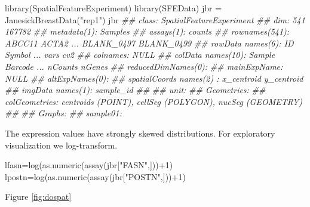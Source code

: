\documentclass[]{article}
\newcommand{\hlnum}[1]{\textcolor[rgb]{0.816,0.125,0.439}{#1}}%
\newcommand{\hlstr}[1]{\textcolor[rgb]{0.251,0.627,0.251}{#1}}%
\newcommand{\hlcom}[1]{\textcolor[rgb]{0.502,0.502,0.502}{\textit{#1}}}%
\newcommand{\hlopt}[1]{\textcolor[rgb]{0,0,0}{#1}}%
\newcommand{\hlstd}[1]{\textcolor[rgb]{0.251,0.251,0.251}{#1}}%
\newcommand{\hlkwd}[1]{\textcolor[rgb]{0.878,0.439,0.125}{#1}}%
\newenvironment{Shaded}{\begin{myshaded}}{\end{myshaded}}
\newcommand{\KeywordTok}[1]{\hlkwd{#1}}
\newcommand{\DecValTok}[1]{\hlnum{#1}}
\newcommand{\StringTok}[1]{\hlstr{#1}}
\newcommand{\CommentTok}[1]{\hlcom{#1}}
\newcommand{\OperatorTok}[1]{\hlopt{#1}}
\newcommand{\NormalTok}[1]{\hlstd{#1}}
\begin{document}
\begin{Shaded}
\begin{Highlighting}[]
\KeywordTok{library}\NormalTok{(SpatialFeatureExperiment)}
\KeywordTok{library}\NormalTok{(SFEData)}
\NormalTok{jbr =}\StringTok{ }\KeywordTok{JanesickBreastData}\NormalTok{(}\StringTok{"rep1"}\NormalTok{)}
\NormalTok{jbr}
\CommentTok{\#\# class: SpatialFeatureExperiment }
\CommentTok{\#\# dim: 541 167782 }
\CommentTok{\#\# metadata(1): Samples}
\CommentTok{\#\# assays(1): counts}
\CommentTok{\#\# rownames(541): ABCC11 ACTA2 ... BLANK\_0497 BLANK\_0499}
\CommentTok{\#\# rowData names(6): ID Symbol ... vars cv2}
\CommentTok{\#\# colnames: NULL}
\CommentTok{\#\# colData names(10): Sample Barcode ... nCounts nGenes}
\CommentTok{\#\# reducedDimNames(0):}
\CommentTok{\#\# mainExpName: NULL}
\CommentTok{\#\# altExpNames(0):}
\CommentTok{\#\# spatialCoords names(2) : x\_centroid y\_centroid}
\CommentTok{\#\# imgData names(1): sample\_id}
\CommentTok{\#\# }
\CommentTok{\#\# unit:}
\CommentTok{\#\# Geometries:}
\CommentTok{\#\# colGeometries: centroids (POINT), cellSeg (POLYGON), nucSeg (GEOMETRY) }
\CommentTok{\#\# }
\CommentTok{\#\# Graphs:}
\CommentTok{\#\# sample01:}
\end{Highlighting}
\end{Shaded}

The expression values have strongly skewed distributions.
For exploratory visualization we log-transform.

\begin{Shaded}
\begin{Highlighting}[]
\NormalTok{lfasn=}\KeywordTok{log}\NormalTok{(}\KeywordTok{as.numeric}\NormalTok{(}\KeywordTok{assay}\NormalTok{(jbr[}\StringTok{"FASN"}\NormalTok{,]))}\OperatorTok{+}\DecValTok{1}\NormalTok{)}
\NormalTok{lpostn=}\KeywordTok{log}\NormalTok{(}\KeywordTok{as.numeric}\NormalTok{(}\KeywordTok{assay}\NormalTok{(jbr[}\StringTok{"POSTN"}\NormalTok{,]))}\OperatorTok{+}\DecValTok{1}\NormalTok{)}
\end{Highlighting}
\end{Shaded}

Figure \ref{fig:dospat}
\end{document}
